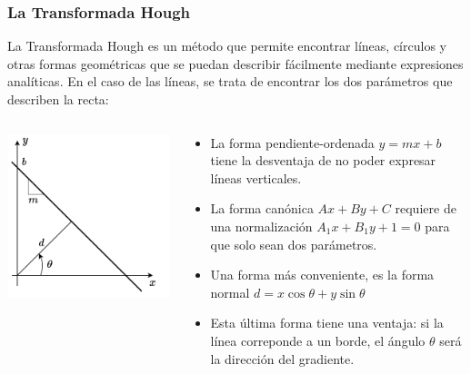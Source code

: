 \begin{frame}\frametitle{La Transformada Hough}
  La Transformada Hough es un método que permite encontrar líneas, círculos y otras formas geométricas que se puedan describir fácilmente mediante expresiones analíticas. En el caso de las líneas, se trata de encontrar los dos parámetros que describen la recta:
  \begin{columns}
    \begin{column}{0.4\textwidth}
      \includegraphics[width=\textwidth]{Figures/Hough2.pdf}
    \end{column}
    \begin{column}{0.6\textwidth}
      \begin{itemize}
      \item La forma pendiente-ordenada $y = mx + b$ tiene la desventaja de no poder expresar líneas verticales.
      \item La forma canónica $Ax + By + C$ requiere de una normalización $A_1 x + B_1 y + 1 = 0$ para que solo sean dos parámetros.
      \item Una forma más conveniente, es la forma normal $d = x\cos\theta + y\sin\theta$
      \item Esta última forma tiene una ventaja: si la línea correponde a un borde, el ángulo $\theta$ será la dirección del gradiente. 
      \end{itemize}
    \end{column}
  \end{columns}
\end{frame}

